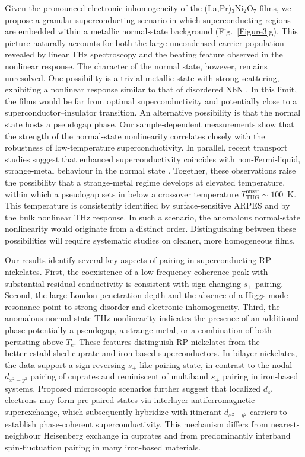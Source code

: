 \documentclass{nature}
\begin{document}
Given the pronounced electronic inhomogeneity of the (La,Pr)$_3$Ni$_2$O$_7$ films, we propose a granular superconducting scenario in which superconducting regions are embedded within a metallic normal‑state background (Fig. \ref{Figure3}g). This picture naturally accounts for both the large uncondensed carrier population revealed by linear THz spectroscopy and the beating feature observed in the nonlinear response. The character of the normal state, however, remains unresolved. One possibility is a trivial metallic state with strong scattering, exhibiting a nonlinear response similar to that of disordered NbN \cite{wang2025anomal}. In this limit, the films would be far from optimal superconductivity and potentially close to a superconductor–insulator transition. An alternative possibility is that the normal state hosts a pseudogap phase. Our sample‑dependent measurements show that the strength of the normal‑state nonlinearity correlates closely with the robustness of low‑temperature superconductivity. In parallel, recent transport studies suggest that enhanced superconductivity coincides with non‑Fermi‑liquid, strange‑metal behaviour in the normal state \cite{zhou2025onset60k}. Together, these observations raise the possibility that a strange‑metal regime develops at elevated temperature, within which a pseudogap sets in below a crossover temperature $T_{\mathrm{THG}}^{\mathrm{onset}}\sim100$ K. This temperature is consistently identified by surface‑sensitive ARPES \cite{shen2025LPSNO} and by the bulk nonlinear THz response. In such a scenario, the anomalous normal‑state nonlinearity would originate from a distinct order. Distinguishing between these possibilities will require systematic studies on cleaner, more homogeneous films.

\vspace{18pt}

Our results identify several key aspects of pairing in superconducting RP nickelates. First, the coexistence of a low‑frequency coherence peak with substantial residual conductivity is consistent with sign‑changing $s_{\pm}$ pairing. Second, the large London penetration depth and the absence of a Higgs‑mode resonance point to strong disorder and electronic inhomogeneity. Third, the anomalous normal-state THz nonlinearity indicates the presence of an additional phase-potentially a pseudogap, a strange metal, or a combination of both—persisting above $T_\mathrm{c}$. These features distinguish RP nickelates from the better‑established cuprate and iron‑based superconductors. In bilayer nickelates, the data support a sign‑reversing $s_{\pm}$‑like pairing state, in contrast to the nodal $d_{x^2-y^2}$ pairing of cuprates and reminiscent of multiband $s_{\pm}$ pairing in iron‑based systems. Proposed microscopic scenarios further suggest that localized $d_{z^2}$ electrons may form pre‑paired states via interlayer antiferromagnetic superexchange, which subsequently hybridize with itinerant $d_{x^2-y^2}$ carriers to establish phase-coherent superconductivity. This mechanism differs from nearest-neighbour Heisenberg exchange in cuprates and from predominantly interband spin‑fluctuation pairing in many iron-based materials.
\end{document}
